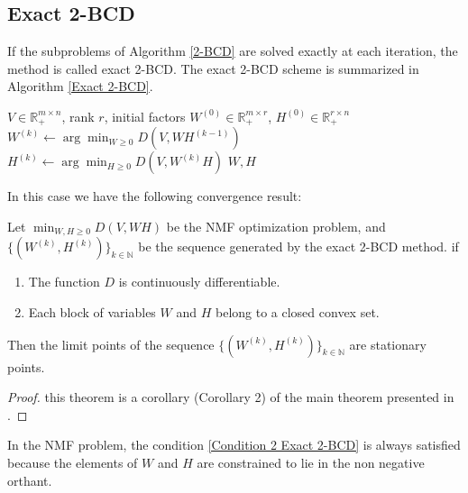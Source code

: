\subsection{Exact 2-BCD}
If the subproblems of Algorithm \ref{2-BCD} are solved exactly at each iteration, the method is called exact 2-BCD.  
The exact 2-BCD scheme is summarized in Algorithm \ref{Exact 2-BCD}.
\begin{algorithm}[ht]
    \caption{Exact two-blocks coordinate descent for NMF}
    \label{Exact 2-BCD}
    \begin{algorithmic}[1]
        \Require \( V \in \mathbb{R}_+^{m \times n} \), rank \( r \), initial factors \( W^{(0)} \in \mathbb{R}_+^{m \times r} \), \( H^{(0)} \in \mathbb{R}_+^{r \times n} \)
            \State \( W^{(k)} \leftarrow \arg\min_{W \geq 0} D(V, WH^{(k - 1)}) \)
            \State \( H^{(k)} \leftarrow \arg\min_{H \geq 0} D(V, W^{(k)}H) \)
        \EndWhile
        \State \Return \( W, H \)
    \end{algorithmic}
\end{algorithm}

In this case we have the following convergence result:
\begin{theorem}\label{Exact 2-BCD theorem}
    Let $\min_{W,H \geq 0} D(V, WH)$ be the NMF optimization problem, and
    \( \{(W^{(k)}, H^{(k)})\}_{k \in \mathbb{N}} \) be the sequence generated by the exact 2-BCD method.
    if \begin{enumerate}
        \item The function \( D \) is continuously differentiable.
        \item Each block of variables $W$ and $H$ belong to a closed convex set. \label{Condition 2 Exact 2-BCD}
    \end{enumerate}
    Then the limit points of the sequence \( \{(W^{(k)}, H^{(k)})\}_{k \in \mathbb{N}} \) are stationary points.
\end{theorem}
\begin{proof}
    this theorem is a corollary (Corollary 2) of the main theorem presented in \cite{GRIPPO2000127}.
\end{proof}
\begin{observation}
    In the NMF problem, the condition \ref{Condition 2 Exact 2-BCD} is always satisfied because the elements of $W$ and $H$ are constrained to lie in the non negative orthant.
\end{observation}
